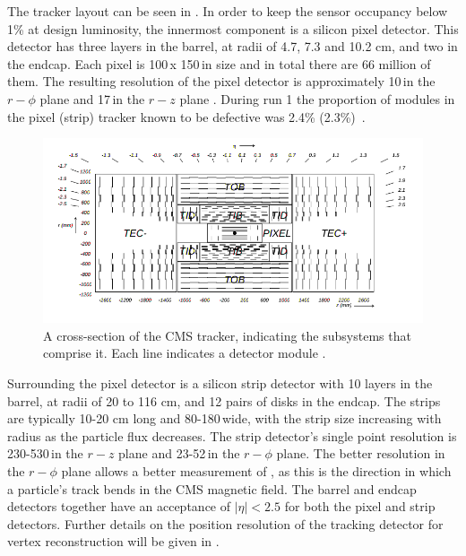 The tracker layout can be seen in . In order to keep the sensor occupancy below 1\% at design luminosity, the innermost component is a silicon pixel detector. This detector has three layers in the barrel, at radii of 4.7, 7.3 and 10.2 cm, and two in the endcap. Each pixel is 100\micron\,x 150\micron\,in size and in total there are 66 million of them. The resulting resolution of the pixel detector is approximately 10\micron\,in the $r-\phi$ plane and 17\micron\,in the $r-z$ plane \cite{trackerperformance}. During run 1 the proportion of modules in the pixel (strip) tracker known to be defective was 2.4\% (2.3\%)~\cite{}.

\begin{figure}
  \includegraphics[width=1.2\largefigwidth]{plots/detector/TrackerSchematic.png}
  \caption{A cross-section of the CMS tracker, indicating the subsystems that comprise it. Each line indicates a detector module \cite{Chatrchyan:2008aa}.}
  \label{fig:trackerschematic}
\end{figure}



Surrounding the pixel detector is a silicon strip detector with 10 layers in the barrel, at radii of 20 to 116 cm, and 12 pairs of disks in the endcap. The strips are typically 10-20 cm long and 80-180\micron\,wide, with the strip size increasing with radius as the particle flux decreases. The strip detector's single point resolution is 230-530\micron\,in the $r-z$ plane and 23-52\micron\,in the $r-\phi$ plane.  The better resolution in the $r-\phi$ plane allows a better measurement of \pt, as this is the direction in which a particle's track bends in the CMS magnetic field. The barrel and endcap detectors together have an acceptance of $|\eta|<2.5$ for both the pixel and strip detectors. Further details on the position resolution of the tracking detector for vertex reconstruction will be given in .


